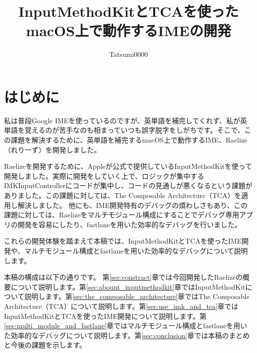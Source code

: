 \documentclass[uplatex,a4j,12pt]{jsarticle}
\begin{document}
\title{\vspace{-10mm}InputMethodKitとTCAを使ったmacOS上で動作するIMEの開発}
\author{Tatsumi0000}
\date{}
\maketitle


\section{はじめに}\label{sec:intro}
私は普段Google IMEを使っているのですが、英単語を補完してくれず、私が英単語を覚えるのが苦手なのも相まっていつも誤字脱字をしがちです。そこで、この課題を解決するために、英単語を補完するmacOS上で動作するIME、Raelize（れりーず）を開発しました。

Raelizeを開発するために、Appleが公式で提供しているInputMethodKitを使って開発しました。実際に開発をしていく上で、ロジックが集中するIMKInputControllerにコードが集中し、コードの見通しが悪くなるという課題がありました。この課題に対しては、The Composable Architecture（TCA）を適用し解決しました。
他にも、IME開発特有のデバッグの煩わしさもあり、この課題に対しては、Raelizeをマルチモジュール構成にすることでデバッグ専用アプリの開発を容易にしたり、fastlaneを用いた効率的なデバッグを行いました。

これらの開発体験を踏まえて本稿では、InputMethodKitとTCAを使ったIME開発や、マルチモジュール構成とfastlaneを用いた効率的なデバッグについて説明します。

本稿の構成は以下の通りです。
第\ref{sec:constract}章では今回開発したRaelizeの概要について説明します。第\ref{sec:abount_inputmethodkit}章ではInputMethodKitについて説明します。第\ref{sec:the_composable_architecture}章ではThe Composable Architecture（TCA）について説明します。第\ref{sec:use_imk_and_tca}章ではInputMethodKitとTCAを使ったIME開発について説明します。第\ref{sec:multi_module_and_fastlane}章ではマルチモジュール構成とfastlaneを用いた効率的なデバッグについて説明します。第\ref{sec:conclusion}章では本稿のまとめと今後の課題を示します。

\end{document}
